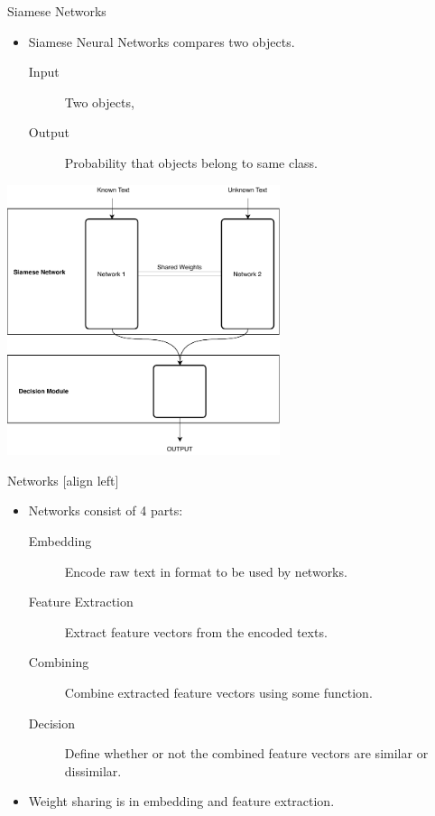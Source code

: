 \documentclass[10pt]{beamer}
\begin{document}
\begin{frame}[fragile]{Siamese Networks}
    \begin{itemize}
        \item Siamese Neural Networks compares two objects.

            \begin{description}
                \item[Input] Two objects,
                \item[Output] Probability that objects belong to same class.
            \end{description}
    \end{itemize}

    \begin{center}
        \includegraphics[width=0.6\textwidth]{../../report/pictures/method/siamese}
    \end{center}
\end{frame}

\begin{frame}[fragile]{Networks}
    [align left]
    \begin{itemize}
        \item Networks consist of 4 parts:

            \begin{description}
                \item[Embedding] Encode raw text in format to be used by
                    networks.
                \item[Feature Extraction] Extract feature vectors from the
                    encoded texts.
                \item[Combining] Combine extracted feature vectors using some
                    function.
                \item[Decision] Define whether or not the combined feature
                    vectors are similar or dissimilar.
            \end{description}

        \item Weight sharing is in embedding and feature extraction.
    \end{itemize}
\end{frame}
\end{document}
